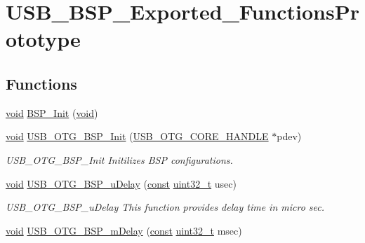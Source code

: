 \hypertarget{group___u_s_b___b_s_p___exported___functions_prototype}{\section{U\-S\-B\-\_\-\-B\-S\-P\-\_\-\-Exported\-\_\-\-Functions\-Prototype}
\label{group___u_s_b___b_s_p___exported___functions_prototype}
}
\subsection*{Functions}
\begin{DoxyCompactItemize}
\item 
\hyperlink{group___n_a_m_e_ga18028b8badbf1ea7e704ccac3c488e82}{void} \hyperlink{group___u_s_b___b_s_p___exported___functions_prototype_ga7c3f1730d68ea5aa990ec47d5da7048d}{B\-S\-P\-\_\-\-Init} (\hyperlink{group___n_a_m_e_ga18028b8badbf1ea7e704ccac3c488e82}{void})
\item 
\hyperlink{group___n_a_m_e_ga18028b8badbf1ea7e704ccac3c488e82}{void} \hyperlink{group___u_s_b___b_s_p___exported___functions_prototype_gacffb89e4346b11dee704fe5a40326a1f}{U\-S\-B\-\_\-\-O\-T\-G\-\_\-\-B\-S\-P\-\_\-\-Init} (\hyperlink{group___u_s_b___c_o_r_e___exported___types_gaf76054c11eb8a3367907aad7ae700e80}{U\-S\-B\-\_\-\-O\-T\-G\-\_\-\-C\-O\-R\-E\-\_\-\-H\-A\-N\-D\-L\-E} $\ast$pdev)
\begin{DoxyCompactList}\small\item\em U\-S\-B\-\_\-\-O\-T\-G\-\_\-\-B\-S\-P\-\_\-\-Init Initilizes B\-S\-P configurations. \end{DoxyCompactList}\item 
\hyperlink{group___n_a_m_e_ga18028b8badbf1ea7e704ccac3c488e82}{void} \hyperlink{group___u_s_b___b_s_p___exported___functions_prototype_gaa70213d9a7b9b047dc6d3357f99e19b5}{U\-S\-B\-\_\-\-O\-T\-G\-\_\-\-B\-S\-P\-\_\-u\-Delay} (\hyperlink{group___n_a_m_e_ga7ae6d0e43244213b34de2c2b9aa30da6}{const} \hyperlink{stdint_8h_a435d1572bf3f880d55459d9805097f62}{uint32\-\_\-t} usec)
\begin{DoxyCompactList}\small\item\em U\-S\-B\-\_\-\-O\-T\-G\-\_\-\-B\-S\-P\-\_\-u\-Delay This function provides delay time in micro sec. \end{DoxyCompactList}\item 
\hyperlink{group___n_a_m_e_ga18028b8badbf1ea7e704ccac3c488e82}{void} \hyperlink{group___u_s_b___b_s_p___exported___functions_prototype_ga28c906bec05a1b7f91aa0e4ff5d8a16c}{U\-S\-B\-\_\-\-O\-T\-G\-\_\-\-B\-S\-P\-\_\-m\-Delay} (\hyperlink{group___n_a_m_e_ga7ae6d0e43244213b34de2c2b9aa30da6}{const} \hyperlink{stdint_8h_a435d1572bf3f880d55459d9805097f62}{uint32\-\_\-t} msec)

\end{DoxyCompactItemize}
